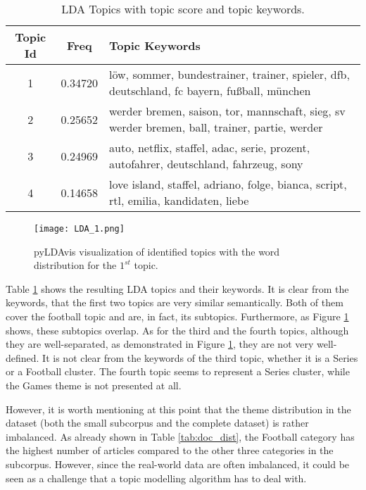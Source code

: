 \documentclass[fontsize=12pt,a4paper,twoside,openany]{scrbook}
\begin{document}
\renewcommand{\arraystretch}{2}
\begin{table}[ht]
    \centering
    \begin{tabularx}{\textwidth}{ |c|c|X| } 
        \hline
        \textbf{Topic Id} & \textbf{Freq} & \textbf{Topic Keywords} \\
        \hline
        1 & 0.34720 &  löw, sommer, bundestrainer, trainer, spieler, dfb, deutschland, fc bayern, fußball, münchen \\
        \hline
        2 & 0.25652 & werder bremen, saison, tor, mannschaft, sieg, sv werder bremen, ball, trainer, partie, werder \\
        \hline
        3 & 0.24969 & auto, netflix, staffel, adac, serie, prozent, autofahrer, deutschland, fahrzeug, sony \\
        \hline
        4 & 0.14658 &  love island, staffel, adriano, folge, bianca, script, rtl, emilia, kandidaten, liebe \\
        \hline
    \end{tabularx}
    \caption{LDA Topics with topic score and topic keywords.}
    \label{tab:lda_topic_keywords}
\end{table}
\renewcommand{\arraystretch}{1}

\begin{figure}[h]
\centering
\texttt{[image: LDA\_1.png]}
\caption{pyLDAvis visualization of identified topics with the word distribution for the \(1^{st}\) topic.}
\label{fig:lda_topics}
\end{figure}

Table \ref{tab:lda_topic_keywords} shows the resulting LDA topics and their keywords. It is clear from the keywords, that the first two topics are very similar semantically. Both of them cover the football topic and are, in fact, its subtopics. Furthermore, as Figure \ref{fig:lda_topics} shows, these subtopics overlap. As for the third and the fourth topics, although they are well-separated, as demonstrated in Figure \ref{fig:lda_topics}, they are not very well-defined. It is not clear from the keywords of the third topic, whether it is a Series or a Football cluster. The fourth topic seems to represent a Series cluster, while the Games theme is not presented at all.

However, it is worth mentioning at this point that the theme distribution in the dataset (both the small subcorpus and the complete dataset) is rather imbalanced. As already shown in Table \ref{tab:doc_dist}, the Football category has the highest number of articles compared to the other three categories in the subcorpus. However, since the real-world data are often imbalanced, it could be seen as a challenge that a topic modelling algorithm has to deal with.
\end{document}
